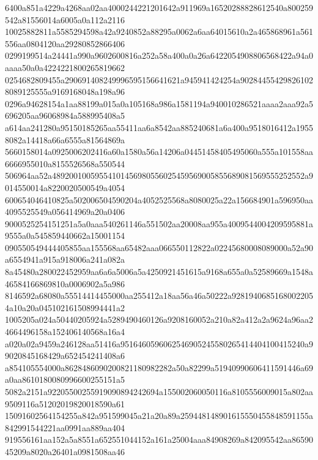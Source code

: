 \documentclass[10pt,letterpaper]{article}
\newenvironment{hexcertificate}{\par\begingroup\ttfamily\scriptsize\raggedright\setlength{\parskip}{0pt}\noindent}{\par\endgroup}
\begin{document}
\begin{hexcertificate}
6400a851a4229a4268aa02aa4000244221201642a911969a16520288828612540a800259542a81556014a6005a0a112a2116\\
10025882811a5585294598a42a9240852a88295a0062a6aa64015610a2a465868961a561556aa0804120aa29280852866406\\
0299199514a24441a990a9602600816a252a58a400a0a26a6422054908806568422a94a0aaaa50a0a4224221800265819662\\
0254682809455a290691408249996595156641621a945941424254a902844554298261028089125555a9169168048a198a96\\
0296a94628154a1aa88199a015a0a105168a986a1581194a940010286521aaaa2aaa92a5696205aa96068984a588995408a5\\
a614aa241280a95150185265aa55411aa6a8542aa885240681a6a400a9518016412a19558082a14418a66a6555a81564869a\\
5660158014a0925006202416a60a1580a56a14206a04451458405495060a555a101558aa6666955010a8155526568a550544\\
506964aa52a48920010059554101456980556025459569005855689081569555252552a9014550014a8220020500549a4054\\
600654046410825a502006504590204a4052525568a8080025a22a156684901a596950aa4095525549a056414969a20a0406\\
9000525254151251a5a0aaa540261146a551502aa20008aa955a4009544004209595881a9555a0a545859440662a15001154\\
090550549444405855aa155568aa65482aaa066550112822a02245680008089000a52a90a6554941a915a918006a241a082a\\
8a45480a280022452959aa6a6a5006a5a4250921451615a9168a655a0a52589669a1548a46584166869810a0006902a5a986\\
8146592a68080a55514414455000aa255412a18aa56a46a50222a92819406851680022054a10a20a045102161508994441a2\\
1005205a024a50440205924a5289490460126a9208160052a210a82a412a2a9624a96aa24664496158a152406140568a16a4\\
a020a02a9459a246128aa51416a9516460596062546905245580265414404100415240a99020845168429a652454241408a6\\
a854105554000a8628486090200821180982282a50a82299a51940990606411591446a69a0aa8610180080996600255151a5\\
5082a2151a92205500255919090894242694a155002060050116a8105556009015a802aa9509116a51202019820018590a61\\
15091602564154255a842a951599045a21a20a89a259448148901615550455848591155a842991544221aa0991aa889aa404\\
919556161aa152a5a8551a652551044152a161a25004aaa84908269a842095542aa8659045209a8020a26401a0981508aa46\\

\end{hexcertificate}
\end{document}
